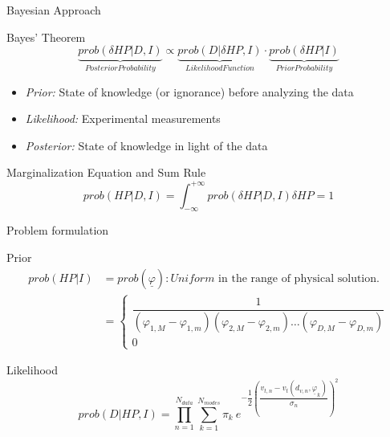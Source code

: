 \documentclass{beamer}
\begin{document}
	\begin{frame}{Bayesian Approach}
		\begin{block}{Bayes' Theorem}
			\begin{equation*}
				\underbrace{prob(\delta HP|D,I)}_{Posterior Probability} \propto
				\underbrace{prob(D|\delta HP,I)}_{Likelihood Function} \cdot \underbrace{prob(\delta HP|I)}_{Prior Probability}
			\end{equation*}
			\begin{itemize}
				\item \textit{Prior:} State of knowledge (or ignorance) before analyzing the data 
				
				\item \textit{Likelihood:} Experimental measurements
				\item \textit{Posterior:} State of knowledge in light of the data
			\end{itemize}
		\end{block}
	
	
		\begin{block}{Marginalization Equation and Sum Rule}
			\begin{equation*}
				prob(HP|D,I) = \int_{-\infty}^{+\infty} prob(\delta HP|D,I) \delta HP = 1
			\end{equation*}
		\end{block}
	\end{frame}
	
	\begin{frame}{Problem formulation}
		\begin{block}{Prior}
			\begin{equation*}
				\begin{split}			
				prob(HP|I) & = prob(\underline{\varphi}) : \textit{Uniform} \text{ in the range of physical solution.}\\
				& = \left\{ 
				\begin{array}{cc}
				\dfrac{1}{(\varphi_{1, M} - \varphi_{1, m}) (\varphi_{2, M} - \varphi_{2, m}) \dots (\varphi_{D, M} - \varphi_{D, m})} \\
				0 
				\end{array} \right.
				\end{split}
			\end{equation*}				
		\end{block}
		
		\begin{block}{Likelihood}
			\begin{equation*}
				prob(D|HP,I) = \prod_{n = 1}^{N_{data}} \sum_{k = 1}^{N_{modes}} \pi_k \ e^{-\dfrac{1}{2} \left(\dfrac{v_{t,n} - v_t(d_{v,n}, \underline{\varphi}_k)}{\sigma_n} \right)^2}
			\end{equation*}
		\end{block}	
	\end{frame}
\end{document}
